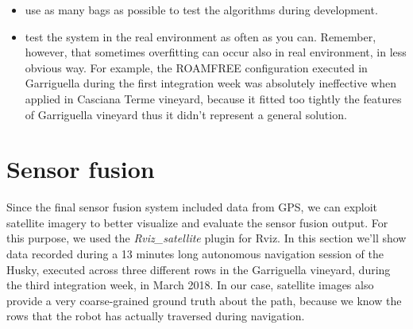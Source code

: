 \begin{enumerate}
\begin{itemize}
	\begin{itemize}
		\item use as many bags as possible to test the algorithms during development.
		\item test the system in the real environment as often as you can. Remember, however, that sometimes overfitting can occur also in real environment, in less obvious way. For example, the ROAMFREE configuration executed in Garriguella during the first integration week was absolutely ineffective when applied in Casciana Terme vineyard, because it fitted too tightly the features of Garriguella vineyard thus it didn't represent a general solution.
	\end{itemize}
\end{itemize}

\end{enumerate}

\section{Sensor fusion}\label{sec:resultsOdometry}

Since the final sensor fusion system included data from GPS, we can exploit satellite imagery to better visualize and evaluate the sensor fusion output. For this purpose, we used the \textit{Rviz\_satellite} plugin for Rviz. In this section we'll show data recorded during a 13 minutes long autonomous navigation session of the Husky, executed across three different rows in the Garriguella vineyard, during the third integration week, in March 2018. In our case, satellite images also provide a very coarse-grained ground truth about the path, because we know the rows that the robot has actually traversed during navigation.

